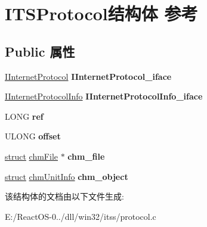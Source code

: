 \hypertarget{struct_i_t_s_protocol}{}\section{I\+T\+S\+Protocol结构体 参考}
\label{struct_i_t_s_protocol}
\subsection*{Public 属性}
\begin{DoxyCompactItemize}
\item 
\mbox{\label{struct_i_t_s_protocol_ac115bbba87f5eb5136502339b2556b85}} 
\hyperlink{interface_i_internet_protocol}{I\+Internet\+Protocol} {\bfseries I\+Internet\+Protocol\+\_\+iface}
\item 
\mbox{\label{struct_i_t_s_protocol_a46e3172dc737279b2650c8ad93ae506c}} 
\hyperlink{interface_i_internet_protocol_info}{I\+Internet\+Protocol\+Info} {\bfseries I\+Internet\+Protocol\+Info\+\_\+iface}
\item 
\mbox{\label{struct_i_t_s_protocol_a56acc330d212e1c9eddfaefb0b6c9009}} 
L\+O\+NG {\bfseries ref}
\item 
\mbox{\label{struct_i_t_s_protocol_a684735a9782130915f5d98799147dfd9}} 
U\+L\+O\+NG {\bfseries offset}
\item 
\mbox{\label{struct_i_t_s_protocol_a81cf56efd9f814c9317d4f4065f4aa21}} 
\hyperlink{interfacestruct}{struct} \hyperlink{structchm_file}{chm\+File} $\ast$ {\bfseries chm\+\_\+file}
\item 
\mbox{\label{struct_i_t_s_protocol_a9de7629279b61be766fbc27edf8cd6e4}} 
\hyperlink{interfacestruct}{struct} \hyperlink{structchm_unit_info}{chm\+Unit\+Info} {\bfseries chm\+\_\+object}
\end{DoxyCompactItemize}


该结构体的文档由以下文件生成\+:\begin{DoxyCompactItemize}
\item 
E\+:/\+React\+O\+S-\/0../dll/win32/itss/protocol.\+c\end{DoxyCompactItemize}
